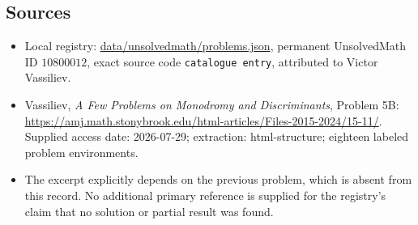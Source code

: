 \documentclass[11pt]{article}
\begin{document}
\subsection{Sources}
\begin{itemize}
\item Local registry: \url{data/unsolvedmath/problems.json}, permanent UnsolvedMath ID $10800012$, exact source code \texttt{catalogue entry}, attributed to Victor Vassiliev.
\item Vassiliev, \emph{A Few Problems on Monodromy and Discriminants}, Problem 5B: \url{https://amj.math.stonybrook.edu/html-articles/Files-2015-2024/15-11/}. Supplied access date: 2026-07-29; extraction: html-structure; eighteen labeled problem environments.
\item The excerpt explicitly depends on the previous problem, which is absent from this record. No additional primary reference is supplied for the registry's claim that no solution or partial result was found.
\end{itemize}
\end{document}
